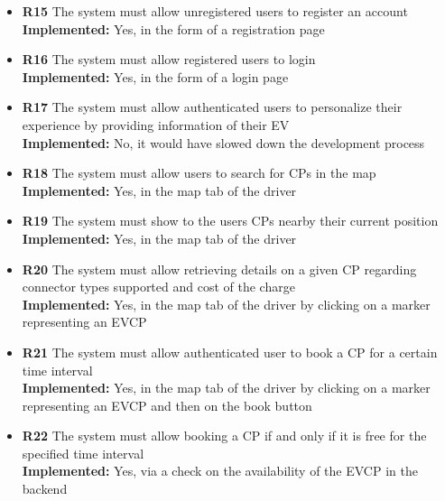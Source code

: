 \begin{itemize}
      \item        \textbf{R15} The system must allow unregistered users to register an account                                                   \\
            \textbf{Implemented:} Yes, in the form of a registration page
      \item        \textbf{R16} The system must allow registered users to login                                                                   \\
            \textbf{Implemented:} Yes, in the form of a login page
      \item        \textbf{R17} The system must allow authenticated users to personalize their experience by providing information of their EV    \\
            \textbf{Implemented:} No, it would have slowed down the development process
      \item        \textbf{R18} The system must allow users to search for CPs in the map                                                          \\
            \textbf{Implemented:} Yes, in the map tab of the driver
      \item        \textbf{R19} The system must show to the users CPs nearby their current position                                               \\
            \textbf{Implemented:} Yes, in the map tab of the driver
      \item        \textbf{R20} The system must allow retrieving details on a given CP regarding connector types supported and cost of the charge \\
            \textbf{Implemented:} Yes, in the map tab of the driver by clicking on a marker representing an EVCP
      \item        \textbf{R21} The system must allow authenticated user to book a CP for a certain time interval                                 \\
            \textbf{Implemented:} Yes, in the map tab of the driver by clicking on a marker representing an EVCP and then on the book button
      \item        \textbf{R22} The system must allow booking a CP if and only if it is free for the specified time interval                      \\
            \textbf{Implemented:} Yes, via a check on the availability of the EVCP in the backend

\end{itemize}

